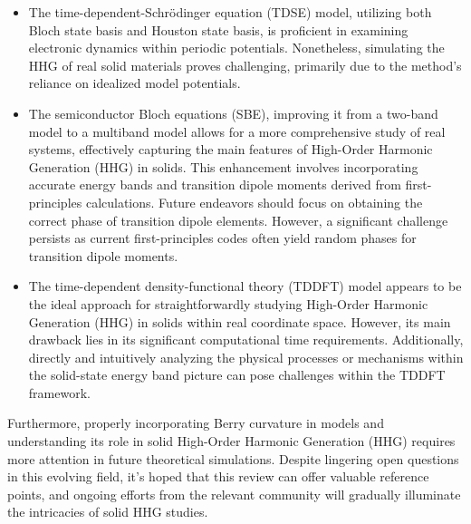 \begin{itemize}
	\item The time-dependent-Schr\"odinger equation (\gls{TDSE}) model, utilizing both Bloch state basis and Houston state basis, is proficient in examining electronic dynamics within periodic potentials. Nonetheless, simulating the HHG of real solid materials proves challenging, primarily due to the method's reliance on idealized model potentials.
	\item The semiconductor Bloch equations (\gls{SBE}), improving it from a two-band model to a multiband model allows for a more comprehensive study of real systems, effectively capturing the main features of High-Order Harmonic Generation (HHG) in solids. This enhancement involves incorporating accurate energy bands and transition dipole moments derived from first-principles calculations. Future endeavors should focus on obtaining the correct phase of transition dipole elements. However, a significant challenge persists as current first-principles codes often yield random phases for transition dipole moments.
	\item The time-dependent density-functional theory (\gls{TDDFT}) model appears to be the ideal approach for straightforwardly studying High-Order Harmonic Generation (HHG) in solids within real coordinate space. However, its main drawback lies in its significant computational time requirements. Additionally, directly and intuitively analyzing the physical processes or mechanisms within the solid-state energy band picture can pose challenges within the TDDFT framework.
\end{itemize}
Furthermore, properly incorporating Berry curvature in models and understanding its role in solid High-Order Harmonic Generation (HHG) requires more attention in future theoretical simulations. Despite lingering open questions in this evolving field, it's hoped that this review can offer valuable reference points, and ongoing efforts from the relevant community will gradually illuminate the intricacies of solid HHG studies.
